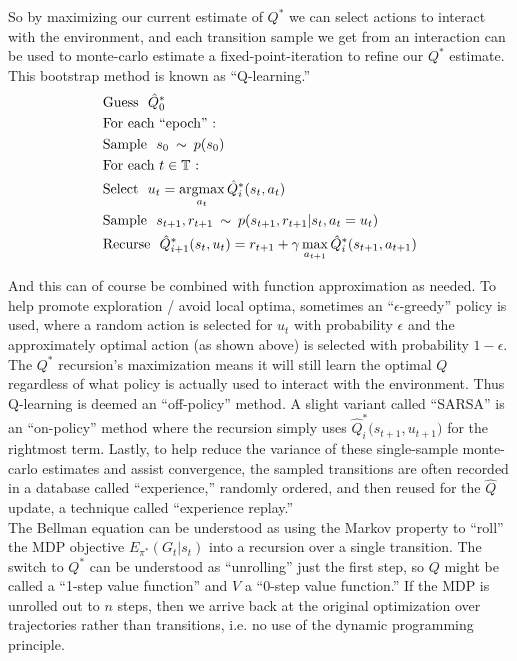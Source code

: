 So by maximizing our current estimate of $Q^*$ we can select actions to interact with the environment, and each transition sample we get from an interaction can be used to monte-carlo estimate a fixed-point-iteration to refine our $Q^*$ estimate. This bootstrap method is known as ``Q-learning.''
\begin{align*}
&\text{Guess}\ \ \hat{Q}^*_0\\
&\text{For each ``epoch'' :}\\
&\text{Sample}\ \ s_0\ \operatorname*{\sim}\ p(s_0)\\
&\text{For each $t \in \mathbb{T}$ :}\\
&\text{Select}\ \ u_t = \operatorname*{argmax}_{a_t} \hat{Q}^*_i(s_t, a_t)\\
&\text{Sample}\ \ s_{t+1}, r_{t+1}\ \operatorname*{\sim}\ p{(}s_{t+1}, r_{t+1} | s_t, a_t=u_t{)}\\
&\text{Recurse}\ \ \hat{Q}^*_{i+1}{(}s_t, u_t{)} = r_{t+1} + \gamma \max_{a_{t+1}} \hat{Q}^*_i{(}s_{t+1}, a_{t+1}{)}
\end{align*}

And this can of course be combined with function approximation as needed. To help promote exploration / avoid local optima, sometimes an ``$\epsilon$-greedy'' policy is used, where a random action is selected for $u_t$ with probability $\epsilon$ and the approximately optimal action (as shown above) is selected with probability $1-\epsilon$. The $Q^*$ recursion's maximization means it will still learn the optimal $Q$ regardless of what policy is actually used to interact with the environment. Thus Q-learning is deemed an ``off-policy'' method. A slight variant called ``SARSA'' is an ``on-policy'' method where the recursion simply uses $\hat{Q}^*_i{(}s_{t+1}, u_{t+1}{)}$ for the rightmost term. Lastly, to help reduce the variance of these single-sample monte-carlo estimates and assist convergence, the sampled transitions are often recorded in a database called ``experience,'' randomly ordered, and then reused for the $\hat{Q}$ update, a technique called ``experience replay.''\\

The Bellman equation can be understood as using the Markov property to ``roll'' the MDP objective $E_{\pi^*}(G_t | s_t)$ into a recursion over a single transition. The switch to $Q^*$ can be understood as ``unrolling'' just the first step, so $Q$ might be called a ``1-step value function'' and $V$ a ``0-step value function.'' If the MDP is unrolled out to $n$ steps, then we arrive back at the original optimization over trajectories rather than transitions, i.e. no use of the dynamic programming principle.\\


